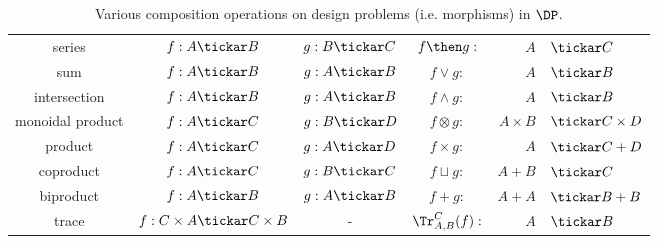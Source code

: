 \begin{table}[t!]
    \centering
\begin{tabular}{c|c|c|crl}
    series &
    $f:A\tickar B$&
    $g:B\tickar C$&
    $f\then g:$&$A$&$\tickar C$ \\
    sum &
    $f:A\tickar B$ &
    $g:A\tickar B$ &
    $f\vee g:$&$A$&$\tickar B$ \\
    intersection &
    $f:A\tickar B$ &
    $g:A\tickar B$ &
    $f\wedge g:$&$A$&$\tickar B$ \\
    monoidal product &
    $f:A\tickar C$&
    $g:B\tickar D$ &
    $f\otimes g:$&$A\times B$&$\tickar C \times D$ \\
    product &
    $f:A\tickar C$&
    $g:A\tickar D$ &
    $f\times g:$&$A $&$\tickar C + D$ \\
    coproduct &
    $f:A\tickar C$&
    $g:B\tickar C$ &
    $f\sqcup g:$&$A + B $&$\tickar C$ \\
    biproduct &
    $f:A\tickar B$ &
    $g:A\tickar B$ &
    $f+ g:$&$A + A$&$\tickar B + B$ \\
    trace &
    $f: C \times A \tickar C \times B$ &
    -&
    $\Tr_{A,B}^C(f) :$&$A$&$\tickar B$
\end{tabular}
    \caption{Various composition operations on design problems (i.e. morphisms) in $\DP$.}
\end{table}